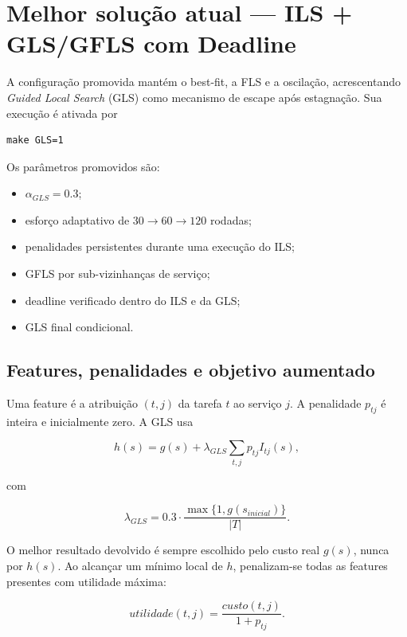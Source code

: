 \documentclass{article}
\begin{document}
\section{Melhor solução atual --- ILS + GLS/GFLS com Deadline}

A configuração promovida mantém o best-fit, a FLS e a oscilação, acrescentando
\textit{Guided Local Search} (GLS) como mecanismo de escape após estagnação.
Sua execução é ativada por

\begin{verbatim}
make GLS=1
\end{verbatim}

Os parâmetros promovidos são:

\begin{itemize}
    \item $\alpha_{GLS}=0.3$;
    \item esforço adaptativo de $30\rightarrow60\rightarrow120$ rodadas;
    \item penalidades persistentes durante uma execução do ILS;
    \item GFLS por sub-vizinhanças de serviço;
    \item deadline verificado dentro do ILS e da GLS;
    \item GLS final condicional.
\end{itemize}

\subsection{Features, penalidades e objetivo aumentado}

Uma feature é a atribuição $(t,j)$ da tarefa $t$ ao serviço $j$. A penalidade
$p_{tj}$ é inteira e inicialmente zero. A GLS usa

\begin{equation}
    h(s)=g(s)+\lambda_{GLS}
    \sum_{t,j}p_{tj}I_{tj}(s),
\end{equation}

com

\begin{equation}
    \lambda_{GLS}=0.3\cdot
    \frac{\max\{1,g(s_{inicial})\}}{|T|}.
\end{equation}

O melhor resultado devolvido é sempre escolhido pelo custo real $g(s)$, nunca
por $h(s)$. Ao alcançar um mínimo local de $h$, penalizam-se todas as features
presentes com utilidade máxima:

\begin{equation}
    utilidade(t,j)=\frac{custo(t,j)}{1+p_{tj}}.
\end{equation}
\end{document}
